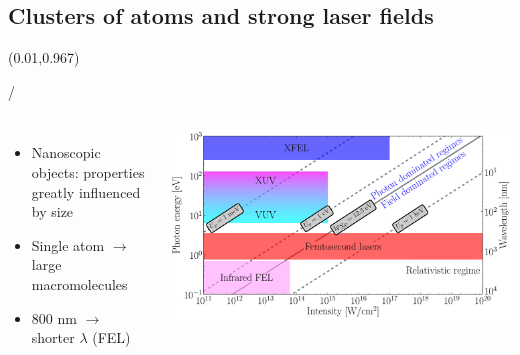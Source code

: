 \documentclass{beamer}
\makeatletter
\newcommand{\framenumber}{
\begin{textblock}{0}(0.01,0.967)
\begin{scriptsize}
{\color{gray}\insertframenumber/\inserttotalframenumber}
\end{scriptsize}
\end{textblock}
}
\makeatother
\begin{document}
\subsection{Clusters of atoms and strong laser fields}
\begin{frame}{}\framenumber
	\begin{columns}
		\begin{itemize}
		\item Nanoscopic objects: properties greatly influenced by size
		\item Single atom $\rightarrow$ large macromolecules
		\item 800 nm $\rightarrow$ shorter $\lambda$ (FEL)
		\end{itemize}
		\includegraphics[width=1.1\textwidth]{../figures/regimes}
	\end{columns}
\end{frame}
\end{document}
